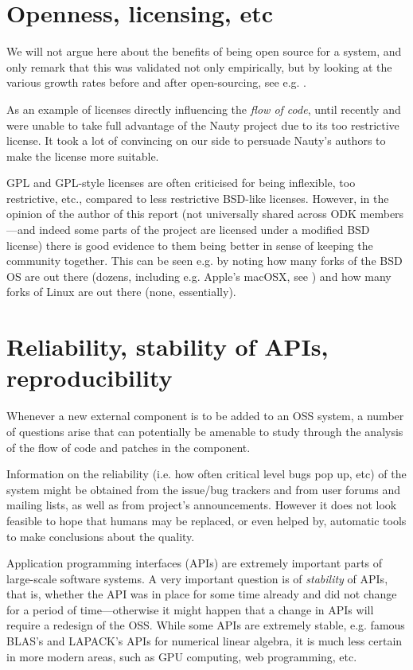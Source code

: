 \documentclass{deliverablereport}
\begin{document}
\section{Openness, licensing, etc}

We will not argue here about the benefits of being open source for a
system, and only remark that this was validated not only empirically,
but by looking at the various growth rates before and after
open-sourcing, see e.g. \cite{wp7:arfonshapeoss}.

As an example of licenses directly influencing the {\em flow of
code}, until recently \Sage and \GAP were unable to take full
advantage of the Nauty project \cite{wp7:nauty} due to its too
restrictive license. It took a lot of convincing on our side to
persuade Nauty's authors to make the license more suitable.

GPL and GPL-style licenses \cite{wp7:gpl} are often criticised
for being inflexible, too restrictive, etc., compared to less
restrictive BSD-like licenses. However, in the opinion of the
author of this report (not universally shared across ODK
members---and indeed some parts of the project are licensed under
a modified BSD license) there is good evidence to them being
better in sense of keeping the community together. This can be
seen e.g. by noting how many forks of the BSD OS are out there
(dozens, including e.g. Apple's macOSX, see \cite{wp7:bsdlist})
and how many forks of Linux are out there (none, essentially). 


\section{Reliability, stability of APIs, reproducibility}
Whenever a new external component is to be added to an OSS system,
a number of questions arise that can potentially be amenable to study through the
analysis of the flow of code and patches in the component.

Information on the reliability (i.e. how often critical level
bugs pop up, etc) of the system might be obtained from the issue/bug
trackers and from user forums and mailing lists, as well as from project's
announcements. However it does not look feasible to hope that
humans may be replaced, or even helped by, automatic tools to
make conclusions about the quality.

Application programming interfaces (APIs) are extremely
important parts of large-scale software systems.
A very important question is of {\em stability} of APIs, that is,
whether the API was in place for some time already and did not change
for a period of time---otherwise it might happen that a change in APIs will
require a redesign of the OSS.
While some APIs are extremely stable, e.g. famous BLAS's and LAPACK's
\cite{2002:USB:567806.567807,Anderson:1990:LPL:110382.110385}
APIs for numerical linear algebra, it is much less certain in more
modern areas, such as GPU computing, web programming, etc.
\end{document}
